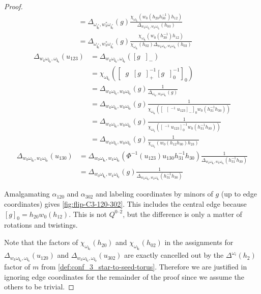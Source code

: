 \documentclass{amsart}
\theoremstyle{plain}
\theoremstyle{definition}
\theoremstyle{remark}
\newcommand{\Qdv}{Q^{0\text{--}2}}
\newcommand{\fundamentalweight}{\omega}
\newcommand{\genminor}[2]{\Delta^{{#1} \fundamentalweight_{#2}}}
\newcommand{\genminoryz}[3]{\Delta_{{#1} \fundamentalweight_{#3}, {#2}%
    \fundamentalweight_{#3}}}
\newcommand{\lifttoG}[1]{{\mathop{\overline{#1}}}}
\newcommand{\dlifttoG}[1]{{\mathop{\overline{\overline{#1}}}}}
\newcommand{\monomialmap}{m}
\newcommand{\word}[1]{\mathbf{#1}}
\begin{document}
\begin{proof}
\begin{align*}
      &= \genminoryz{}{w_k^{\ast}}{\word{i}_k^{\ast}}(g) \frac{\chi_{\fundamentalweight_{\word{i}_k}}\left(w_0(h_{20} h_{30}^{-1}) h_{12}\right)}{\genminoryz{w_k}{w_k}{\word{i}_k}(h_{03})} \\
      &= \genminoryz{}{w_k^{\ast}}{\word{i}_k^{\ast}}(g) \frac{\chi_{\fundamentalweight_{\word{i}_k}}\left(w_0(h_{30}^{-1}) h_{12}\right)}{\chi_{\fundamentalweight_{\word{i}_k}}(h_{02}) \genminoryz{w_k}{w_k}{\word{i}_k}(h_{03})}
    \end{align*}
    \begin{align*}
      \genminoryz{w_k}{}{\word{i}_k}(u_{123}) &= \genminoryz{w_k}{}{\word{i}_k}([g \lifttoG{w_0}]_{-}) \\
      &= \chi_{\fundamentalweight_{\word{i}_k}}\left(\left[ \dlifttoG{w_k^{-1}} g \lifttoG{w_0} [g \lifttoG{w_0}]_{+}^{-1} [g \lifttoG{w_0}]_{0}^{-1} \right]_{0}\right) \\
      &= \genminoryz{w_k}{w_0}{\word{i}_k}(g) \frac{1}{\genminoryz{}{w_0}{\word{i}_k}(g)} \\
      &= \genminoryz{w_k}{w_0}{\word{i}_k}(g) \frac{1}{\chi_{\fundamentalweight_{\word{i}_k}}([\lifttoG{w_0} [\lifttoG{w_0}^{-1} u_{123}]_{-}]_{0} w_0(h_{31}^{-1} h_{30}))} \\
      &= \genminoryz{w_k}{w_0}{\word{i}_k}(g) \frac{1}{\chi_{\fundamentalweight_{\word{i}_k}}([\lifttoG{w_0}^{-1} u_{123}]_{0}^{-1} w_0(h_{31}^{-1} h_{30}))} \\
      &= \genminoryz{w_k}{w_0}{\word{i}_k}(g) \frac{1}{\chi_{\fundamentalweight_{\word{i}_k}}(w_0(h_{12} h_{30}) h_{23})}
    \end{align*}
    \begin{align*}
      \genminoryz{w_0}{w_k}{\word{i}_k}(u_{130}) &= \genminoryz{w_0}{w_k}{\word{i}_k}(\Phi^{-1}(u_{123}) u_{130} h_{31}^{-1} h_{30}) \frac{1}{\genminoryz{w_k}{w_k}{\word{i}_k}(h_{31}^{-1} h_{30})} \\
      &= \genminoryz{w_0}{w_k}{\word{i}_k}(g) \frac{1}{\genminoryz{w_k}{w_k}{\word{i}_k}(h_{31}^{-1} h_{30})}
    \end{align*}

    Amalgamating $\alpha_{120}$ and $\alpha_{302}$ and labeling
    coordinates by minors of $g$ (up to edge coordinates) gives
    \cref{fig:flip-C3-120-302}. This includes the central edge because
    $[g]_{0} = h_{20} w_0(h_{12})$. This is not $\Qdv$, but the
    difference is only a matter of rotations and twistings.

    Note that the factors of
    $\chi_{\fundamentalweight_{\word{i}_k}}(h_{20})$ and
    $\chi_{\fundamentalweight_{\word{i}_k}}(h_{02})$ in the assignments
    for $\genminoryz{w_k}{}{\word{i}_k}(u_{120})$ and
    $\genminoryz{w_k}{}{\word{i}_k}(u_{302})$ are exactly cancelled out
    by the $\genminor{}{i}(h_2)$ factor of $\monomialmap$ from
    \cref{def:conf_3_star-to-seed-torus}. Therefore we are justified in
    ignoring edge coordinates for the remainder of the proof since we
    assume the others to be trivial.


\end{proof}
\end{document}
